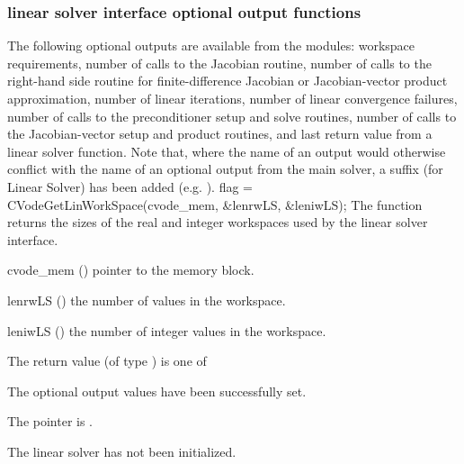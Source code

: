 \subsubsection{{\cvls} linear solver interface optional output functions}
\label{sss:optout_ls}
The following optional outputs are available from the {\cvls} modules:
workspace requirements,
number of calls to the Jacobian routine,
number of calls to the right-hand side routine for finite-difference Jacobian or Jacobian-vector product approximation,
number of linear iterations,
number of linear convergence failures,
number of calls to the preconditioner setup and solve routines,
number of calls to the Jacobian-vector setup and product routines,
and last return value from a linear solver function.
Note that, where the name of an output would otherwise conflict with
the name of an optional output from the main solver, a suffix 
(for Linear Solver) has been added (e.g. ).
{
  flag = CVodeGetLinWorkSpace(cvode\_mem, \&lenrwLS, \&leniwLS);
}
{
  The function  returns the sizes of the real and
  integer workspaces used by the {\cvls} linear solver interface.
}
{
  \begin{args}
  \item[cvode\_mem] ()
    pointer to the {\cvode} memory block.
  \item[lenrwLS] ()
    the number of  values in the {\cvls} workspace.
  \item[leniwLS] ()
    the number of integer values in the {\cvls} workspace.
  \end{args}
}
{
  The return value  (of type ) is one of
  \begin{args}
  \item[\Id{CVLS\_SUCCESS}]
    The optional output values have been successfully set.
  \item[\Id{CVLS\_MEM\_NULL}]
    The  pointer is .
  \item[\Id{CVLS\_LMEM\_NULL}]
    The {\cvls} linear solver has not been initialized.
  \end{args}
}
